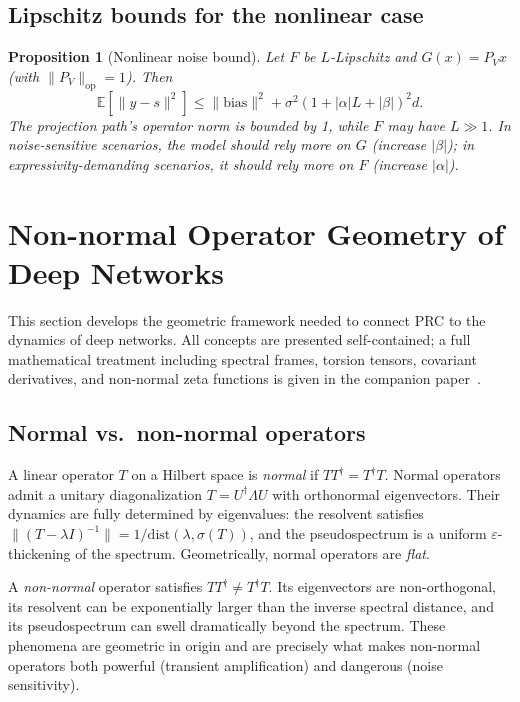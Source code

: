 \documentclass[11pt,a4paper]{article}
\newtheorem{proposition}[theorem]{Proposition}
\theoremstyle{definition}
\begin{document}
\subsection{Lipschitz bounds for the nonlinear case}
\label{sec:nonlinear}

\begin{proposition}[Nonlinear noise bound]
\label{prop:lipschitz}
Let $F$ be $L$-Lipschitz and $G(x) = P_V x$ (with $\|P_V\|_{\mathrm{op}} = 1$).
Then
\[
  \mathbb{E}[\|y - s\|^2]
  \leq \|\text{bias}\|^2 + \sigma^2(1 + |\alpha| L + |\beta|)^2 d.
\]
The projection path's operator norm is bounded by 1, while $F$ may have $L \gg 1$.
In noise-sensitive scenarios, the model should rely more on $G$ (increase $|\beta|$);
in expressivity-demanding scenarios, it should rely more on $F$ (increase $|\alpha|$).
\end{proposition}

\section{Non-normal Operator Geometry of Deep Networks}
\label{sec:nnog}

This section develops the geometric framework needed to connect PRC
to the dynamics of deep networks. All concepts are presented
self-contained; a full mathematical treatment including spectral
frames, torsion tensors, covariant derivatives, and non-normal zeta
functions is given in the companion paper~\cite{cheng2025nnog}.

\subsection{Normal vs.\ non-normal operators}

A linear operator $T$ on a Hilbert space is \emph{normal} if
$TT^\dagger = T^\dagger T$. Normal operators admit a unitary
diagonalization $T = U^\dagger \Lambda U$ with orthonormal eigenvectors.
Their dynamics are fully determined by eigenvalues: the resolvent
satisfies $\|(T - \lambda I)^{-1}\| = 1/\mathrm{dist}(\lambda, \sigma(T))$,
and the pseudospectrum is a uniform $\varepsilon$-thickening of the
spectrum. Geometrically, normal operators are \emph{flat}.

A \emph{non-normal} operator satisfies $TT^\dagger \neq T^\dagger T$.
Its eigenvectors are non-orthogonal, its resolvent can be exponentially
larger than the inverse spectral distance, and its pseudospectrum can
swell dramatically beyond the spectrum. These phenomena are
geometric in origin and are precisely what makes non-normal operators
both powerful (transient amplification) and dangerous (noise sensitivity).
\end{document}
